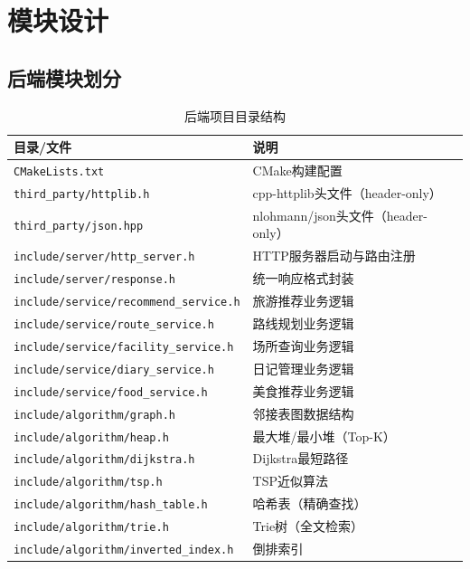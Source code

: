 \documentclass[12pt,a4paper]{report}
\begin{document}
\chapter{模块设计}

\section{后端模块划分}

\begin{table}[H]
\centering
\caption{后端项目目录结构}
\small
\begin{tabularx}{\textwidth}{X l}
\toprule
\textbf{目录/文件} & \textbf{说明} \\
\midrule
\texttt{CMakeLists.txt} & CMake构建配置 \\
\texttt{third\_party/httplib.h} & cpp-httplib头文件（header-only） \\
\texttt{third\_party/json.hpp} & nlohmann/json头文件（header-only） \\
\midrule
\texttt{include/server/http\_server.h} & HTTP服务器启动与路由注册 \\
\texttt{include/server/response.h} & 统一响应格式封装 \\
\texttt{include/service/recommend\_service.h} & 旅游推荐业务逻辑 \\
\texttt{include/service/route\_service.h} & 路线规划业务逻辑 \\
\texttt{include/service/facility\_service.h} & 场所查询业务逻辑 \\
\texttt{include/service/diary\_service.h} & 日记管理业务逻辑 \\
\texttt{include/service/food\_service.h} & 美食推荐业务逻辑 \\
\texttt{include/algorithm/graph.h} & 邻接表图数据结构 \\
\texttt{include/algorithm/heap.h} & 最大堆/最小堆（Top-K） \\
\texttt{include/algorithm/dijkstra.h} & Dijkstra最短路径 \\
\texttt{include/algorithm/tsp.h} & TSP近似算法 \\
\texttt{include/algorithm/hash\_table.h} & 哈希表（精确查找） \\
\texttt{include/algorithm/trie.h} & Trie树（全文检索） \\
\texttt{include/algorithm/inverted\_index.h} & 倒排索引 \\

\end{tabularx}
\end{table}
\end{document}
